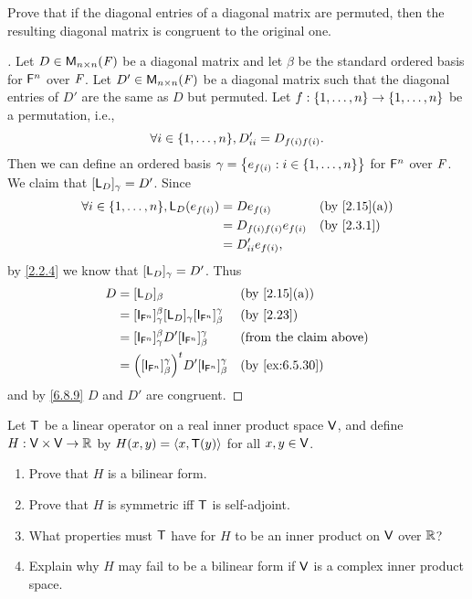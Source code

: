 \setcounter{ex}{22}
\begin{ex}\label{ex:6.8.23}
  Prove that if the diagonal entries of a diagonal matrix are permuted, then the resulting diagonal matrix is congruent to the original one.
\end{ex}

\begin{proof}[]
  Let \(D \in \ms[n][n][\F]\) be a diagonal matrix and let \(\beta\) be the standard ordered basis for \(\mathsf{F}^n\) over \(\mathit{F}\).
  Let \(D' \in \ms[n][n][\F]\) be a diagonal matrix such that the diagonal entries of \(D'\) are the same as \(D\) but permuted.
  Let \(f : \left\lbrace1, \dots, n\right\rbrace \to \left\lbrace1, \dots, n\right\rbrace\) be a permutation, i.e.,
  \[
    \forall i \in \set{1, \dots, n}, D_{i i}' = D_{f(i) f(i)}.
  \]
  Then we can define an ordered basis \(\gamma = \left\lbrace e_{f(i)} : i \in \left\lbrace1, \dots, n\right\rbrace\right\rbrace\) for \(\mathsf{F}^n\) over \(\mathit{F}\).
  We claim that \([\mathsf{L}_D]_{\gamma} = D'\).
  Since
  \begin{align*}
    \forall i \in \set{1, \dots, n}, \L_D(e_{f(i)}) & = D e_{f(i)}             &  & \by{2.15}[a] \\
                                                    & = D_{f(i) f(i)} e_{f(i)} &  & \by{2.3.1}   \\
                                                    & = D_{i i}' e_{f(i)},
  \end{align*}
  by \cref{2.2.4} we know that \([\mathsf{L}_D]_{\gamma} = D'\).
  Thus
  \begin{align*}
    D & = [\L_D]_{\beta}                                                                    &  & \by{2.15}[a]                  \\
      & = [\IT[\vs{F}^n]]_{\gamma}^{\beta} [\L_D]_{\gamma} [\IT[\vs{F}^n]]_{\beta}^{\gamma} &  & \by{2.23}                     \\
      & = [\IT[\vs{F}^n]]_{\gamma}^{\beta} D' [\IT[\vs{F}^n]]_{\beta}^{\gamma}              &  & \text{(from the claim above)} \\
      & = \tp{\pa{[\IT[\vs{F}^n]]_{\beta}^{\gamma}}} D' [\IT[\vs{F}^n]]_{\beta}^{\gamma}    &  & \by{ex:6.5.30}
  \end{align*}
  and by \cref{6.8.9} \(D\) and \(D'\) are congruent.
\end{proof}

\begin{ex}\label{ex:6.8.24}
  Let \(\mathsf{T}\) be a linear operator on a real inner product space \(\mathsf{V}\), and define \(H : \mathsf{V} \times \mathsf{V} \to \mathbb{R}\) by \(H(x, y) = \left\langle x, \mathsf{T}(y)\right\rangle\) for all \(x, y \in \mathsf{V}\).
  \begin{enumerate}
    \item Prove that \(H\) is a bilinear form.
    \item Prove that \(H\) is symmetric iff \(\mathsf{T}\) is self-adjoint.
    \item What properties must \(\mathsf{T}\) have for \(H\) to be an inner product on \(\mathsf{V}\) over \(\mathbb{R}\)?
    \item Explain why \(H\) may fail to be a bilinear form if \(\mathsf{V}\) is a complex inner product space.
  \end{enumerate}
\end{ex}

